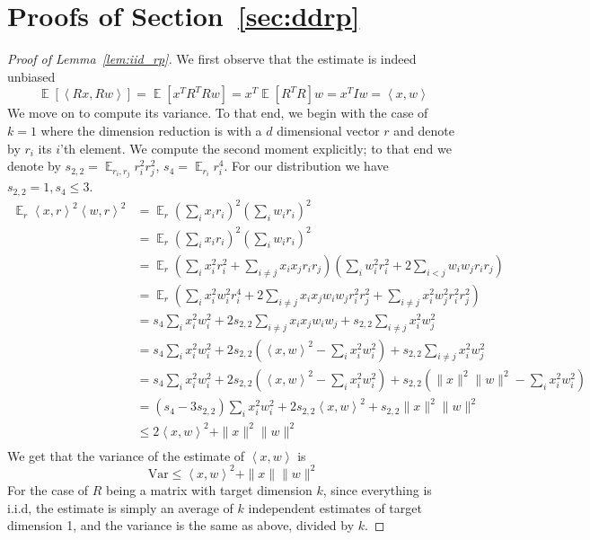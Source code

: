 \documentclass{article}
\theoremstyle{definition}
\theoremstyle{plain}
\newcommand{\Var}{\text{Var}}
\DeclareMathOperator{\E}{\mathbb{E}}
\newcommand{\ip}[1]{\left \langle #1 \right \rangle}
\begin{document}
\section{Proofs of Section~\ref{sec:ddrp}} \label{sec:proof_ddrp}
\begin{proof} [Proof of Lemma~\ref{lem:iid_rp}]
We first observe that the estimate is indeed unbiased
$$\E[\ip{Rx, Rw}] = \E[x^TR^TRw] = x^T\E[R^TR]w = x^TIw = \ip{x,w}$$
We move on to compute its variance. To that end, we begin with the case of $k=1$ where the dimension reduction is with a $d$ dimensional vector $r$ and denote by $r_i$ its $i$'th element. We compute the second moment explicitly; to that end we denote by $s_{2,2} = \E_{r_i,r_j} r_i^2 r_j^2$, $s_{4} = \E_{r_i } r_i^4$. For our distribution we have $s_{2,2}=1, s_{4} \leq 3$.
\begin{align*}
    \E_{r } \ip{x, r}^2 \ip{w, r}^2 &= \E_r \left( \sum_i x_i r_i \right)^2 \left( \sum_i w_i r_i \right)^2\\
 &= \E_{r} \left(\sum_i x_i r_i\right)^2 \left(\sum_i w_i r_i\right)^2 \\
&=\E_r \left(\sum_i x_i^2 r_i^2 +  \sum_{i \neq j} x_i x_j r_i r_j \right) \left(\sum_i w_i^2 r_i^2 + 2 \sum_{i < j} w_i w_j r_i r_j \right)\\
&= \E_r \left(\sum_i x_i^2 w_i^2 r_i^4 + 2 \sum_{i \neq j} x_i x_j w_i w_j r_i^2 r_j^2 + \sum_{i \neq j} x_i^2 w_j^2 r_i^2 r_j^2\right) \\
&= s_4 \sum_i x_i^2 w_i^2  + 2 s_{2,2} \sum_{i \neq j} x_i x_j w_i w_j  + s_{2,2} \sum_{i \neq j} x_i^2 w_j^2 \\
&= s_4 \sum_i x_i^2 w_i^2  + 2 s_{2,2}\left(\ip{x,w}^2 - \sum_i x_i^2 w_i^2\right) + s_{2,2} \sum_{i \neq j} x_i^2 w_j^2 \\
&= s_4 \sum_i x_i^2 w_i^2  + 2 s_{2,2}\left(\ip{x,w}^2 - \sum_i x_i^2 w_i^2\right) + s_{2,2} \left( \|x\|^2\|w\|^2 - \sum_i x_i^2 w_i^2 \right)  \\
&= \left(s_4 - 3s_{2,2}\right)  \sum_i x_i^2 w_i^2 + 2s_{2,2} \ip{x, w}^2 + s_{2,2} \|x\|^2 \|w\|^2 \\
&\leq 2\ip{x, w}^2 + \|x\|^2 \|w\|^2 \\
\end{align*}
We get that the variance of the estimate of $\ip{x,w}$ is
$$\Var \leq \ip{x,w}^2 + \|x\|\|w\|^2$$
For the case of $R$ being a matrix with target dimension $k$, since everything is i.i.d, the estimate is simply an average of $k$ independent estimates of target dimension 1, and the variance is the same as above, divided by $k$.
\end{proof}
\end{document}
